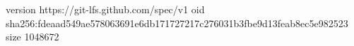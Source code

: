 version https://git-lfs.github.com/spec/v1
oid sha256:fdeaad549ae578063691e6db171727217c276031b3fbe9d13feab8ec5e982523
size 1048672
